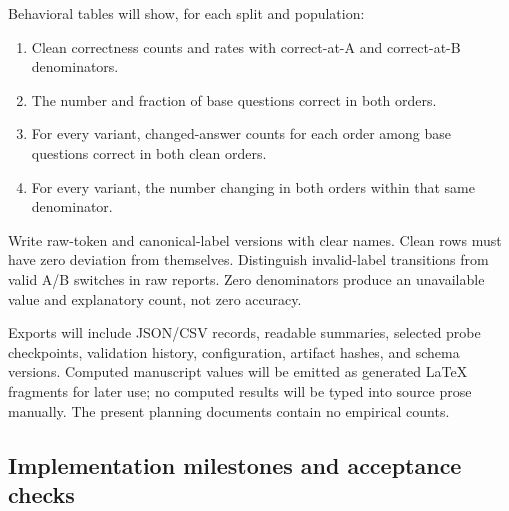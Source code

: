 \documentclass[11pt]{article}
\begin{document}
Behavioral tables will show, for each split and population:
\begin{enumerate}
\item Clean correctness counts and rates with correct-at-A and correct-at-B denominators.
\item The number and fraction of base questions correct in both orders.
\item For every variant, changed-answer counts for each order among base questions correct in both clean orders.
\item For every variant, the number changing in both orders within that same denominator.
\end{enumerate}
Write raw-token and canonical-label versions with clear names.
Clean rows must have zero deviation from themselves.
Distinguish invalid-label transitions from valid A/B switches in raw reports.
Zero denominators produce an unavailable value and explanatory count, not zero accuracy.

Exports will include JSON/CSV records, readable summaries, selected probe checkpoints, validation history, configuration, artifact hashes, and schema versions.
Computed manuscript values will be emitted as generated LaTeX fragments for later \verb|| use; no computed results will be typed into source prose manually.
The present planning documents contain no empirical counts.

\subsection{Implementation milestones and acceptance checks}
\end{document}
